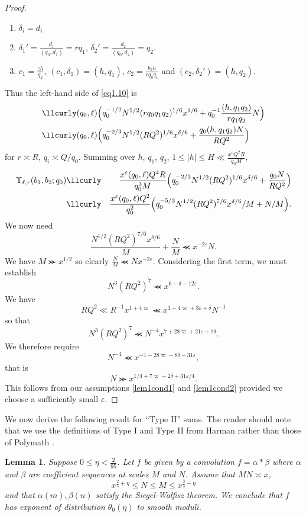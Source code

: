 \documentclass[12pt]{amsart}
\theoremstyle{plain}
\newtheorem{lem}{Lemma}
\theoremstyle{definition}
\numberwithin{equation}{section}
\def \a{\alpha} \def \b{\beta} \def \d{\delta} \def \e{\varepsilon} \def \g{\gamma} \def \k{\kappa} \def \l{\lambda} \def \s{\sigma} \def \t{\theta} \def \z{\zeta}
\renewcommand{\lessapprox}{\llcurly}
\renewcommand{\gtrapprox}{\ggcurly}
\begin{document}
\begin{proof}
\begin{enumerate}
\item  $\d_i = d_i$ 

\item $\d_1' = \frac{d_1}{(q_0, d_1)} = rq_1$, $\d_2' = \frac{d_2}{(q_0, d_2)} = q_2$. 

\item  $c_1 = \frac{zh}{q_2}$, $(c_1, \d_1) = (h, q_1)$, $c_2 = \frac{b_2h}{rq_0q_1}$ and $(c_2, \d_2') = (h, q_2)$.
\end{enumerate}
Thus the left-hand side of \eqref{eq1.10} is
\begin{align*}
&\lessapprox  (q_0,\ell)\Bigl(q_0^{-1/2} N^{1/2} (rq_0q_1q_2)^{1/6} x^{\delta/6}+
q_0^{-1}\frac{(h,q_1q_2)}{rq_1q_2}N\Bigr)\\
&\lessapprox  (q_0,\ell)\Bigl(q_0^{-2/3} N^{1/2} (RQ^2)^{1/6} x^{\delta/6}+\frac{q_0(h,q_1q_2)N}{RQ^2}\Bigr)\\
\end{align*}
for $r\asymp R$, $q_i \asymp Q/q_0$. Summing over $h$, $q_1$, $q_2$, $1 \le |h| \le H \ll \frac{x^\e Q^2 R}{q_0M}$,
 \begin{align*}
\Upsilon_{\ell,r}(b_1, b_2;q_0) &\lessapprox&
\frac{x^{\e}(q_0,\ell) Q^4 R}{q_0^3M}\Bigl(q_0^{-2/3} N^{1/2} (RQ^2)^{1/6} x^{\delta/6}+\frac{q_0N}{RQ^2}\Bigr)\\
&\lessapprox& \frac{x^{\e}(q_0,\ell) Q^2}{q_0^2}\Bigl(q_0^{-5/3} N^{1/2} (RQ^2)^{7/6} x^{\delta/6}/M+N/M\Bigr).\\
\end{align*}
We now need 
$$\frac{N^{1/2} (RQ^2)^{7/6} x^{\delta/6}}{M}+\frac NM \lessapprox x^{-2\e} N.$$
We have $M\gtrapprox x^{1/2}$ so clearly $\frac{N}{M}\lessapprox Nx^{-2\e}$. Considering the first term, we must establish  
$$N^3 (RQ^2)^7 \lessapprox x^{6-\delta-12\e}.$$
We have 
$$RQ^2\ll R^{-1}x^{1+4\varpi}\lessapprox  x^{1+4\varpi+3\e+\delta}N^{-1}$$ 
so that 
$$N^3(RQ^2)^7\lessapprox N^{-4}x^{7+28\varpi+21\e+7\delta}.$$
We therefore require 
$$N^{-4}\lessapprox x^{-1-28\varpi-8\delta-31\e},$$
that is 
$$N\gtrapprox x^{1/4+7\varpi+2\delta+31\e/4}.$$
This follows from our assumptions \eqref{lem1cond1} and \eqref{lem1cond2} provided we choose a sufficiently small $\e$.  
 \end{proof}


We now derive the following result for ``Type II'' sums.  The reader should note that we use the definitions of Type I and Type II from Harman \cite{harmanbook} rather than those of Polymath \cite{polymath8a}.  

\begin{lem}\label{type2}
Suppose $0\leq \eta<\frac{2}{95}$.   Let $f$ be given by a convolution $f=\alpha*\beta$ where $\alpha$ and $\beta$ are coefficient sequences at scales $M$ and $N$.  Assume that $MN\asymp x$, 
$$x^{\frac25+\eta}\leq N\leq M\leq x^{\frac35-\eta}$$
and that $\a(m),\beta(n)$ satisfy the Siegel-Walfisz theorem. We conclude that $f$ has exponent of distribution $\theta_0(\eta)$ to smooth moduli.  
\end{lem} 
\end{document}
